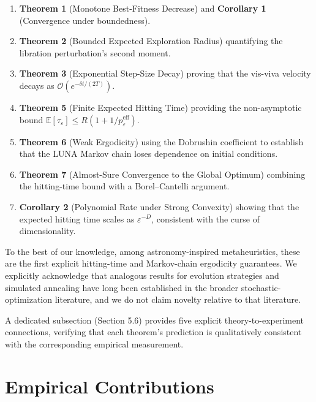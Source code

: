 \documentclass[11pt,a4paper]{article}
\begin{document}
\begin{enumerate}
\item \textbf{Theorem 1} (Monotone Best-Fitness Decrease) and \textbf{Corollary 1} (Convergence under boundedness).
\item \textbf{Theorem 2} (Bounded Expected Exploration Radius) quantifying the libration perturbation's second moment.
\item \textbf{Theorem 3} (Exponential Step-Size Decay) proving that the vis-viva velocity decays as $\mathcal{O}(e^{-\delta t / (2T)})$.
\item \textbf{Theorem 5} (Finite Expected Hitting Time) providing the non-asymptotic bound $\mathbb{E}[\tau_\varepsilon] \le R(1 + 1/p_\varepsilon^{\mathrm{eff}})$.
\item \textbf{Theorem 6} (Weak Ergodicity) using the Dobrushin coefficient to establish that the LUNA Markov chain loses dependence on initial conditions.
\item \textbf{Theorem 7} (Almost-Sure Convergence to the Global Optimum) combining the hitting-time bound with a Borel--Cantelli argument.
\item \textbf{Corollary 2} (Polynomial Rate under Strong Convexity) showing that the expected hitting time scales as $\varepsilon^{-D}$, consistent with the curse of dimensionality.
\end{enumerate}

To the best of our knowledge, among astronomy-inspired metaheuristics, these are the first explicit hitting-time and Markov-chain ergodicity guarantees. We explicitly acknowledge that analogous results for evolution strategies and simulated annealing have long been established in the broader stochastic-optimization literature, and we do not claim novelty relative to that literature.

A dedicated subsection (Section 5.6) provides five explicit theory-to-experiment connections, verifying that each theorem's prediction is qualitatively consistent with the corresponding empirical measurement.

\section*{Empirical Contributions}
\end{document}
